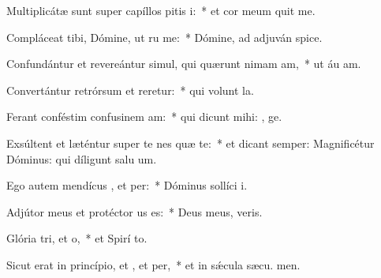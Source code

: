 \item Multiplicátæ sunt super capíllos pitis i:~* et cor meum quit me.
\item Compláceat tibi, Dómine, ut ru me:~* Dómine, ad adjuván  spice.
\item Confundántur et revereántur simul, qui quærunt nimam am,~* ut áu am.
\item Convertántur retrórsum et reretur:~* qui volunt  la.
\item Ferant conféstim confusinem am:~* qui dicunt mihi: , ge.
\item Exsúltent et læténtur super te nes quæ te:~* et dicant semper: Magnificétur Dóminus: qui díligunt salu um.
\item Ego autem mendícus , et per:~* Dóminus sollíci  i.
\item Adjútor meus et protéctor us  es:~* Deus meus,  veris.
\item Glória tri, et o,~* et Spirí to.
\item Sicut erat in princípio, et , et per,~* et in sǽcula sæcu. men.
